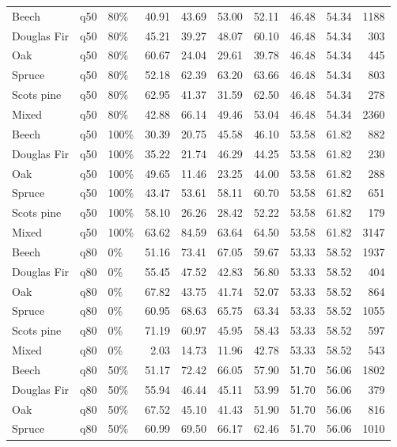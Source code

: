 \begin{longtable}{lllrrrrrrr}
  Beech & q50 & 80\% & 40.91 & 43.69 & 53.00 & 52.11 & 46.48 & 54.34 & 1188 \\ 
  Douglas Fir & q50 & 80\% & 45.21 & 39.27 & 48.07 & 60.10 & 46.48 & 54.34 & 303 \\ 
  Oak & q50 & 80\% & 60.67 & 24.04 & 29.61 & 39.78 & 46.48 & 54.34 & 445 \\ 
  Spruce & q50 & 80\% & 52.18 & 62.39 & 63.20 & 63.66 & 46.48 & 54.34 & 803 \\ 
  Scots pine & q50 & 80\% & 62.95 & 41.37 & 31.59 & 62.50 & 46.48 & 54.34 & 278 \\ 
  Mixed & q50 & 80\% & 42.88 & 66.14 & 49.46 & 53.04 & 46.48 & 54.34 & 2360 \\ 
  Beech & q50 & 100\% & 30.39 & 20.75 & 45.58 & 46.10 & 53.58 & 61.82 & 882 \\ 
  Douglas Fir & q50 & 100\% & 35.22 & 21.74 & 46.29 & 44.25 & 53.58 & 61.82 & 230 \\ 
  Oak & q50 & 100\% & 49.65 & 11.46 & 23.25 & 44.00 & 53.58 & 61.82 & 288 \\ 
  Spruce & q50 & 100\% & 43.47 & 53.61 & 58.11 & 60.70 & 53.58 & 61.82 & 651 \\ 
  Scots pine & q50 & 100\% & 58.10 & 26.26 & 28.42 & 52.22 & 53.58 & 61.82 & 179 \\ 
  Mixed & q50 & 100\% & 63.62 & 84.59 & 63.64 & 64.50 & 53.58 & 61.82 & 3147 \\ 
  Beech & q80 & 0\% & 51.16 & 73.41 & 67.05 & 59.67 & 53.33 & 58.52 & 1937 \\ 
  Douglas Fir & q80 & 0\% & 55.45 & 47.52 & 42.83 & 56.80 & 53.33 & 58.52 & 404 \\ 
  Oak & q80 & 0\% & 67.82 & 43.75 & 41.74 & 52.07 & 53.33 & 58.52 & 864 \\ 
  Spruce & q80 & 0\% & 60.95 & 68.63 & 65.75 & 63.34 & 53.33 & 58.52 & 1055 \\ 
  Scots pine & q80 & 0\% & 71.19 & 60.97 & 45.95 & 58.43 & 53.33 & 58.52 & 597 \\ 
  Mixed & q80 & 0\% & 2.03 & 14.73 & 11.96 & 42.78 & 53.33 & 58.52 & 543 \\ 
  Beech & q80 & 50\% & 51.17 & 72.42 & 66.05 & 57.90 & 51.70 & 56.06 & 1802 \\ 
  Douglas Fir & q80 & 50\% & 55.94 & 46.44 & 45.11 & 53.99 & 51.70 & 56.06 & 379 \\ 
  Oak & q80 & 50\% & 67.52 & 45.10 & 41.43 & 51.90 & 51.70 & 56.06 & 816 \\ 
  Spruce & q80 & 50\% & 60.99 & 69.50 & 66.17 & 62.46 & 51.70 & 56.06 & 1010 \\ 

\end{longtable}
